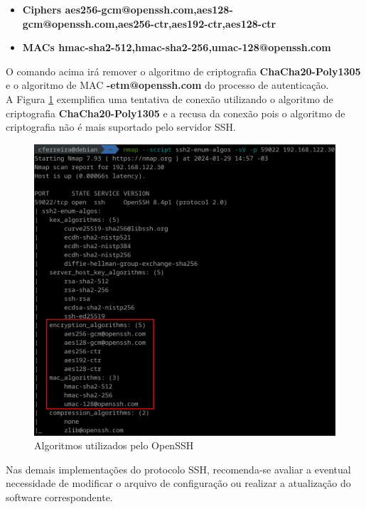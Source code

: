 \documentclass[12pt]{article}
\begin{document}
\begin{itemize}
    \item \small \textbf{Ciphers aes256-gcm@openssh.com,aes128-gcm@openssh.com,aes256-ctr,aes192-ctr,aes128-ctr}
    \item \small \textbf{MACs hmac-sha2-512,hmac-sha2-256,umac-128@openssh.com}
\end{itemize}

O comando acima irá remover o algoritmo de criptografia \textbf{ChaCha20-Poly1305} e o algoritmo de MAC \textbf{-etm@openssh.com} do processo de autenticação.\\

A Figura \ref{fig:terrapin_depois} exemplifica uma tentativa de conexão utilizando o algoritmo de criptografia \textbf{ChaCha20-Poly1305} e a recusa da conexão pois o algoritmo de criptografia não é mais suportado pelo servidor SSH.

\begin{figure}[H]
	\centering
	\includegraphics[scale=0.50]{terrapin_depois.png}
	\caption{Algoritmos utilizados pelo OpenSSH}
	\label{fig:terrapin_depois}
\end{figure}

Nas demais implementações do protocolo SSH, recomenda-se avaliar a eventual necessidade de modificar o arquivo de configuração ou realizar a atualização do software correspondente.
\end{document}
